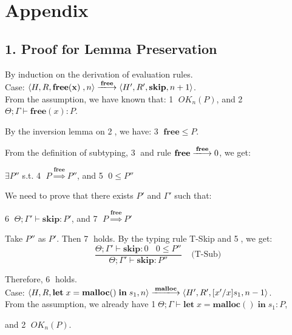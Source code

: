 \documentclass[english]{jssst_ppl} %
\newcommand\LET{\mathbf{let}\;}
\newcommand\FREE{\mathbf{free(x)}\;}
\newcommand\IN{\mathbf{in}\;}
\newcommand\SKIP{\mathbf{skip}}
\newcommand\Rtab{\; \; \; \;}
\newcommand\MALLOC{\mathbf{malloc()}\;}
\newcommand\Malloc{\mathbf{malloc}}
\newcommand\Free{\mathbf{free}}
\newcommand\Cirx{(x)}
\begin{document}
\newpage
\appendix
\section*{Appendix}
\subsection*{1. Proof for Lemma Preservation}

By induction on the derivation of evaluation rules.\\

\noindent Case: $\langle H, R, \FREE, n \rangle \xlongrightarrow{\Free} \langle H', R', \SKIP, n + 1 \rangle $. \\

From the assumption, we have known that: \textcircled{1} $OK_{n}(P)$, and \textcircled{2} $\Theta; \Gamma \vdash \Free\Cirx:P$.

By the inversion lemma on \textcircled{2}, we have: \textcircled{3} $\Free \le P$.

From the definition of subtyping, \textcircled{3} and rule $\Free \xlongrightarrow{\Free} 0$, we get:
\begin{center}
$\exists P''$ s.t. \textcircled{4} $P \overset{\text{$\Free$}}{\Longrightarrow} P''$,  and \textcircled{5} $0 \le P''$
\end{center}

We need to prove that there exists $P'$ and $\Gamma'$ such that:
\begin{center}
\textcircled{6} $\Theta; \Gamma' \vdash \SKIP: P'$,  and \textcircled{7} $P \overset{\text{$\Free$}}{\Longrightarrow} P'$
\end{center}

Take $P''$ as $P'$. Then \textcircled{7} holds. By the typing rule T-Skip and \textcircled{5}, we get:
$$
   \frac{\Theta; \Gamma' \vdash \SKIP : 0 \ \ \ \  0 \le P''}
   {\Theta; \Gamma' \vdash \SKIP : P''}
   \Rtab \mbox{(T-Sub)}
$$

Therefore, \textcircled{6} holds. \\

\noindent Case: $\langle H, R, \LET x = \MALLOC \IN s_{1}, n \rangle \xlongrightarrow{\Malloc} \langle H', R', [x'/x]s_{1}, n - 1  \rangle $.\\

From the assumption, we already have \textcircled{1}$\Theta; \Gamma \vdash \LET x = \MALLOC \IN s_{1} : P$,

and \textcircled{2} $OK_{n}(P)$.
\end{document}
